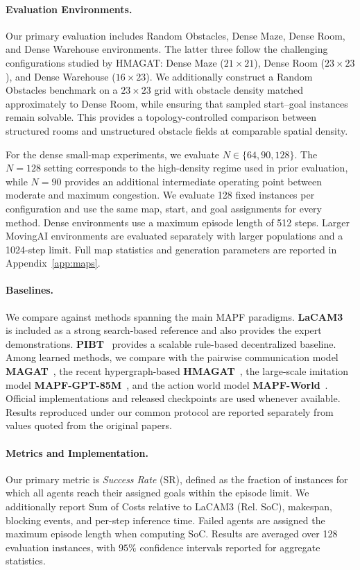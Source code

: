 \documentclass{article} %
\begin{document}
\paragraph{Evaluation Environments.}
Our primary evaluation includes Random Obstacles, Dense Maze, Dense Room, and Dense Warehouse environments. The latter three follow the challenging configurations studied by HMAGAT: Dense Maze ($21\times21$), Dense Room ($23\times23$), and Dense Warehouse ($16\times23$). We additionally construct a Random Obstacles benchmark on a $23\times23$ grid with obstacle density matched approximately to Dense Room, while ensuring that sampled start--goal instances remain solvable. This provides a topology-controlled comparison between structured rooms and unstructured obstacle fields at comparable spatial density.

For the dense small-map experiments, we evaluate $N\in\{64,90,128\}$. The $N=128$ setting corresponds to the high-density regime used in prior evaluation, while $N=90$ provides an additional intermediate operating point between moderate and maximum congestion. We evaluate 128 fixed instances per configuration and use the same map, start, and goal assignments for every method. Dense environments use a maximum episode length of 512 steps. Larger MovingAI environments are evaluated separately with larger populations and a 1024-step limit. Full map statistics and generation parameters are reported in Appendix~\ref{app:maps}.

\paragraph{Baselines.}
We compare against methods spanning the main MAPF paradigms. \textbf{LaCAM3}~\cite{okumura2024lacam3} is included as a strong search-based reference and also provides the expert demonstrations. \textbf{PIBT}~\cite{okumura2022priority} provides a scalable rule-based decentralized baseline. Among learned methods, we compare with the pairwise communication model \textbf{MAGAT}~\cite{li2021magat}, the recent hypergraph-based \textbf{HMAGAT}~\cite{jain2026hmagat}, the large-scale imitation model \textbf{MAPF-GPT-85M}~\cite{andreychuk2025mapf}, and the action world model \textbf{MAPF-World}~\cite{yang2025mapfworld}. Official implementations and released checkpoints are used whenever available. Results reproduced under our common protocol are reported separately from values quoted from the original papers.

\paragraph{Metrics and Implementation.}
Our primary metric is \emph{Success Rate} (SR), defined as the fraction of instances for which all agents reach their assigned goals within the episode limit. We additionally report Sum of Costs relative to LaCAM3 (Rel. SoC), makespan, blocking events, and per-step inference time. Failed agents are assigned the maximum episode length when computing SoC. Results are averaged over 128 evaluation instances, with $95\%$ confidence intervals reported for aggregate statistics.
\end{document}
